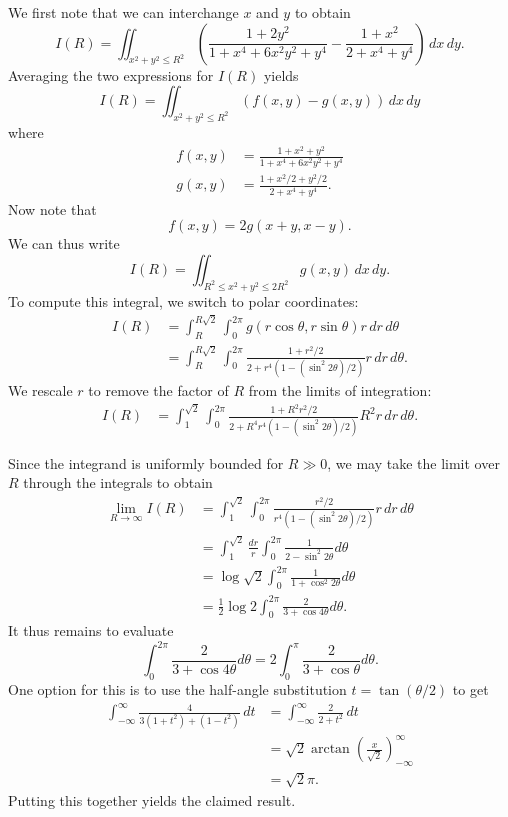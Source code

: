 \documentclass[amssymb,twocolumn,pra,10pt,aps]{revtex4-1}
\begin{document}
\begin{itemize}
We first note that we can interchange $x$ and $y$ to obtain
\[
I(R) = \iint_{x^2+y^2 \leq R^2} \left( \frac{1+2y^2}{1+x^4+6x^2y^2+y^4} - \frac{1+x^2}{2+x^4+y^4} \right)\,dx\,dy.
\]
Averaging the two expressions for $I(R)$ yields
\[
I(R) = \iint_{x^2+y^2 \leq R^2} (f(x,y) - g(x,y))\,dx\,dy
\]
where
\begin{align*}
f(x,y) &= \frac{1+x^2+y^2}{1 + x^4 + 6x^2y^2 + y^4} \\
g(x,y) &= \frac{1+x^2/2+y^2/2}{2 + x^4 + y^4}.
\end{align*}
Now note that
\[f(x,y) = 2 g(x+y, x-y).
\]
We can thus write
\[
I(R) = \iint_{R^2 \leq x^2 +y^2 \leq 2R^2} g(x,y)\,dx\,dy.
\]
To compute this integral, we switch to polar coordinates:
\begin{align*}
I(R) &= \int_R^{R\sqrt{2}} \int_0^{2\pi} g(r\cos \theta, r \sin \theta)r\,dr\,d\theta \\
&=  \int_R^{R\sqrt{2}} \int_0^{2\pi} \frac{1 + r^2/2}{2 + r^4(1 - (\sin^2 2\theta)/2)} r\,dr\,d\theta.
\end{align*}
We rescale $r$ to remove the factor of $R$ from the limits of integration:
\begin{align*}
I(R) & =  \int_1^{\sqrt{2}} \int_0^{2\pi} \frac{1 + R^2 r^2/2}{2 + R^4 r^4(1 - (\sin^2 2\theta)/2)} R^2 r\,dr\,d\theta.
\end{align*}

Since the integrand is uniformly bounded for $R \gg 0$, we may take the limit over $R$ through the integrals to obtain
\begin{align*}
\lim_{R \to \infty} I(R) &= \int_1^{\sqrt{2}} \int_0^{2\pi} \frac{r^2/2}{r^4(1 - (\sin^2 2\theta)/2)} r\,dr\,d\theta \\
&= \int_1^{\sqrt{2}} \frac{dr}{r} \int_0^{2\pi} \frac{1}{2- \sin^2 2\theta} d\theta \\
&= \log \sqrt{2} \int_0^{2\pi} \frac{1}{1 + \cos^2 2\theta} d\theta \\
&= \frac{1}{2} \log 2 \int_0^{2\pi} \frac{2}{3 + \cos 4\theta} d\theta.
\end{align*}
It thus remains to evaluate 
\[
\int_0^{2\pi} \frac{2}{3 + \cos 4\theta} d\theta = 
2 \int_0^{\pi} \frac{2}{3 + \cos \theta} d\theta.
\]
One option for this is to use the half-angle substitution $t = \tan (\theta/2)$ to get
\begin{align*}
\int_{-\infty}^\infty \frac{4}{3(1+t^2) + (1-t^2)}\,dt
&= \int_{-\infty}^\infty \frac{2}{2+t^2}\,dt \\
&= \sqrt{2} \arctan \left( \frac{x}{\sqrt{2}} \right)^{\infty}_{-\infty} \\
&= \sqrt{2} \pi.
\end{align*}
Putting this together yields the claimed result.


\end{itemize}
\end{document}
